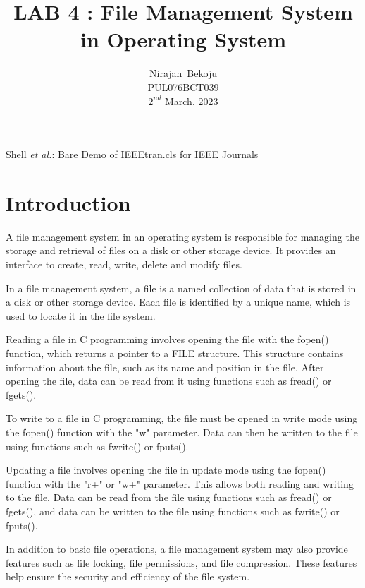 \documentclass[journal,onecolumn]{IEEEtran}
\begin{document}
\title{LAB 4 : File Management System in Operating System}

\author{Nirajan~Bekoju \\ PUL076BCT039 \\ $2^{nd}$ March, 2023}

%
{Shell \MakeLowercase{\textit{et al.}}: Bare Demo of IEEEtran.cls for IEEE Journals}

\maketitle

\IEEEpeerreviewmaketitle

\section{Introduction}
A file management system in an operating system is responsible for managing the storage and retrieval of files on a disk or other storage device. It provides an interface to create, read, write, delete and modify files.

In a file management system, a file is a named collection of data that is stored in a disk or other storage device. Each file is identified by a unique name, which is used to locate it in the file system.

Reading a file in C programming involves opening the file with the fopen() function, which returns a pointer to a FILE structure. This structure contains information about the file, such as its name and position in the file. After opening the file, data can be read from it using functions such as fread() or fgets().

To write to a file in C programming, the file must be opened in write mode using the fopen() function with the "w" parameter. Data can then be written to the file using functions such as fwrite() or fputs().

Updating a file involves opening the file in update mode using the fopen() function with the "r+" or "w+" parameter. This allows both reading and writing to the file. Data can be read from the file using functions such as fread() or fgets(), and data can be written to the file using functions such as fwrite() or fputs().

In addition to basic file operations, a file management system may also provide features such as file locking, file permissions, and file compression. These features help ensure the security and efficiency of the file system.
\end{document}
